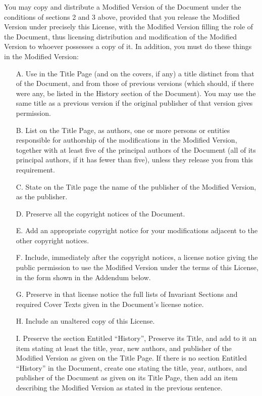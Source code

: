 \documentclass[]{report}
\theoremstyle{definition}
\theoremstyle{remark}
\theoremstyle{plain}
\numberwithin{equation}{chapter}
\begin{document}
\begin{multicols*}{2}
You may copy and distribute a Modified Version of the Document under
the conditions of sections 2 and 3 above, provided that you release
the Modified Version under precisely this License, with the Modified
Version filling the role of the Document, thus licensing distribution
and modification of the Modified Version to whoever possesses a copy
of it.  In addition, you must do these things in the Modified Version:

\begin{itemize}
	\item[A.] 
	Use in the Title Page (and on the covers, if any) a title distinct
	from that of the Document, and from those of previous versions
	(which should, if there were any, be listed in the History section
	of the Document).  You may use the same title as a previous version
	if the original publisher of that version gives permission.

	\item[B.]
	List on the Title Page, as authors, one or more persons or entities
	responsible for authorship of the modifications in the Modified
	Version, together with at least five of the principal authors of the
	Document (all of its principal authors, if it has fewer than five),
	unless they release you from this requirement.

	\item[C.]
	State on the Title page the name of the publisher of the
	Modified Version, as the publisher.

	\item[D.]
	Preserve all the copyright notices of the Document.

	\item[E.]
	Add an appropriate copyright notice for your modifications
	adjacent to the other copyright notices.

	\item[F.]
	Include, immediately after the copyright notices, a license notice
	giving the public permission to use the Modified Version under the
	terms of this License, in the form shown in the Addendum below.

	\item[G.]
	Preserve in that license notice the full lists of Invariant Sections
	and required Cover Texts given in the Document's license notice.

	\item[H.]
	Include an unaltered copy of this License.

	\item[I.]
	Preserve the section Entitled ``History'', Preserve its Title, and add
	to it an item stating at least the title, year, new authors, and
	publisher of the Modified Version as given on the Title Page.  If
	there is no section Entitled ``History'' in the Document, create one
	stating the title, year, authors, and publisher of the Document as
	given on its Title Page, then add an item describing the Modified
	Version as stated in the previous sentence.


\end{itemize}
\end{multicols*}
\end{document}

